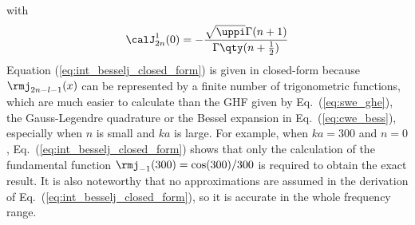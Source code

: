 with 
\begin{equation}
    \calJ_{2n}^1(0) = -\frac{\sqrt{\uppi} \Gamma(n+1) }{\Gamma\qty(n+\frac{1}{2})}
\end{equation}
Equation (\ref{eq:int_besselj_closed_form}) is given in closed-form because $\rmj_{2n-l-1}(x)$ can be represented by a finite number of trigonometric functions, which are much easier to calculate than the GHF given by Eq.~(\ref{eq:swe_ghe}), the Gauss-Legendre quadrature or the Bessel expansion in Eq.~(\ref{eq:cwe_bess}), especially when $n$ is small and $ka$ is large.
For example, when $ka = 300$ and $n = 0$, Eq.~(\ref{eq:int_besselj_closed_form}) shows that only the calculation of the fundamental function $\rmj_{-1}(300) = \cos(300)/300$ is required to obtain the exact result. 
It is also noteworthy that no approximations are assumed in the derivation of Eq.~(\ref{eq:int_besselj_closed_form}), so it is accurate in the whole frequency range.



